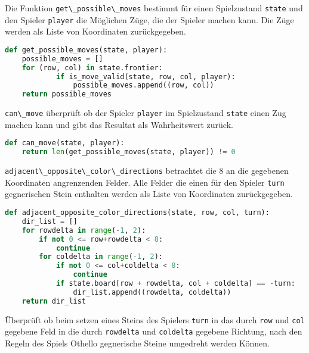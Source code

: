 Die Funktion \passthrough{\lstinline!get\_possible\_moves!} bestimmt für
einen Spielzustand \passthrough{\lstinline!state!} und den Spieler
\passthrough{\lstinline!player!} die Möglichen Züge, die der Spieler
machen kann. Die Züge werden als Liste von Koordinaten zurückgegeben.

\begin{lstlisting}[language=Python]
def get_possible_moves(state, player):
    possible_moves = []
    for (row, col) in state.frontier:
            if is_move_valid(state, row, col, player):
                possible_moves.append((row, col))
    return possible_moves
\end{lstlisting}

\passthrough{\lstinline!can\_move!} überprüft ob der Spieler
\passthrough{\lstinline!player!} im Spielzustand
\passthrough{\lstinline!state!} einen Zug machen kann und gibt das
Resultat als Wahrheitswert zurück.

\begin{lstlisting}[language=Python]
def can_move(state, player):
    return len(get_possible_moves(state, player)) != 0
\end{lstlisting}

\passthrough{\lstinline!adjacent\_opposite\_color\_directions!}
betrachtet die 8 an die gegebenen Koordinaten angrenzenden Felder. Alle
Felder die einen für den Spieler \passthrough{\lstinline!turn!}
gegnerischen Stein enthalten werden als Liste von Koordinaten
zurückgegeben.

\begin{lstlisting}[language=Python]
def adjacent_opposite_color_directions(state, row, col, turn):
    dir_list = []
    for rowdelta in range(-1, 2):
        if not 0 <= row+rowdelta < 8:
            continue
        for coldelta in range(-1, 2):
            if not 0 <= col+coldelta < 8:
                continue
            if state.board[row + rowdelta, col + coldelta] == -turn:
                dir_list.append((rowdelta, coldelta))
    return dir_list
\end{lstlisting}

Überprüft ob beim setzen eines Steins des Spielers
\passthrough{\lstinline!turn!} in das durch
\passthrough{\lstinline!row!} und \passthrough{\lstinline!col!} gegebene
Feld in die durch \passthrough{\lstinline!rowdelta!} und
\passthrough{\lstinline!coldelta!} gegebene Richtung, nach den Regeln
des Spiels Othello gegnerische Steine umgedreht werden Können.

